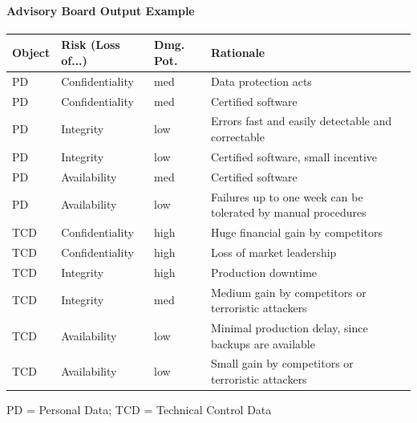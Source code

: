 \documentclass[a4paper]{article}
\begin{document}
\begin{multicols}{3}
    \paragraph{Advisory Board Output Example}
    \begin{tabular}{ l | l | p{.6cm} | p{4cm} }
        Object & Risk (Loss of...) & Dmg. Pot. & Rationale                                                     \\\hline
        PD     & Confidentiality   & med       & Data protection acts                                          \\
        PD     & Confidentiality   & med       & Certified software                                            \\
        PD     & Integrity         & low       & Errors fast and easily detectable and correctable             \\
        PD     & Integrity         & low       & Certified software, small incentive                           \\
        PD     & Availability      & med       & Certified software                                            \\
        PD     & Availability      & low       & Failures up to one week can be tolerated by manual procedures \\
        TCD    & Confidentiality   & high      & Huge financial gain by competitors                            \\
        TCD    & Confidentiality   & high      & Loss of market leadership                                     \\
        TCD    & Integrity         & high      & Production downtime                                           \\
        TCD    & Integrity         & med       & Medium gain by competitors or terroristic attackers           \\
        TCD    & Availability      & low       & Minimal production delay, since backups are available         \\
        TCD    & Availability      & low       & Small gain by competitors or terroristic attackers
    \end{tabular}
    PD = Personal Data; TCD = Technical Control Data


\end{multicols}
\end{document}
